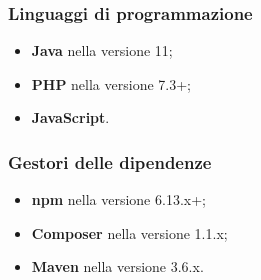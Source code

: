 	\subsubsection{Linguaggi di programmazione}
		\begin{itemize}
			\item \textbf{Java} nella versione 11;
			\item \textbf{PHP} nella versione 7.3+;
			\item \textbf{JavaScript}.
		\end{itemize}
	\subsubsection{Gestori delle dipendenze}
		\begin{itemize}
			\item \textbf{npm} nella versione 6.13.x+;
			\item \textbf{Composer} nella versione 1.1.x;
			\item \textbf{Maven} nella versione 3.6.x.
		\end{itemize}
